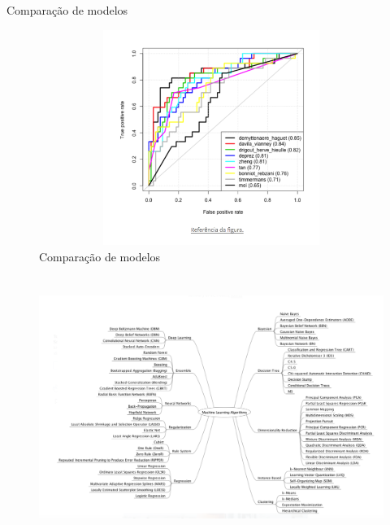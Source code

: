 \begin{frame}	
	\begin{block}{Comparação de modelos}	
		\begin{figure}[!htb]
			\centering	  				
			\includegraphics[height=7cm, width = 12cm]{./pic/MultiROC.png}
			\caption{Comparação de modelos}
			\label{fig_comparacao_modelos}
		\end{figure}
	\end{block}
\end{frame}


\begin{frame}	

		\begin{figure}
			\includegraphics[height=8.5cm, width = 12cm]{./pic/algoritmos1.png}
			\label{fig_modelos}
		\end{figure}

\end{frame}

